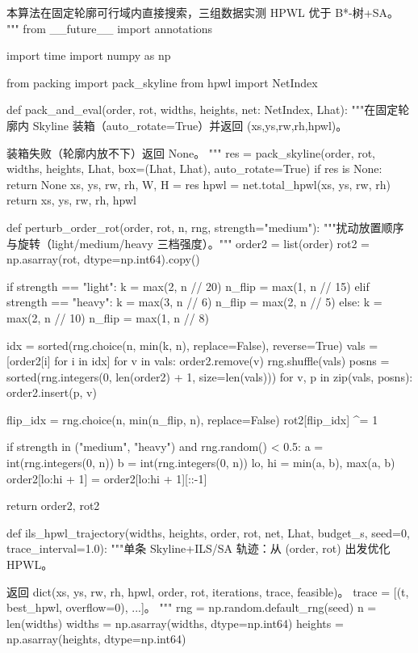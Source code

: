 \documentclass{JXUSTmodeling}
\begin{document}
\begin{appendixx}
\begin{python}
本算法在固定轮廓可行域内直接搜索，三组数据实测 HPWL 优于 B*-树+SA。
"""
from __future__ import annotations

import time
import numpy as np

from packing import pack_skyline
from hpwl import NetIndex


def pack_and_eval(order, rot, widths, heights, net: NetIndex, Lhat):
    """在固定轮廓内 Skyline 装箱（auto_rotate=True）并返回 (xs,ys,rw,rh,hpwl)。

    装箱失败（轮廓内放不下）返回 None。
    """
    res = pack_skyline(order, rot, widths, heights, Lhat,
                       box=(Lhat, Lhat), auto_rotate=True)
    if res is None:
        return None
    xs, ys, rw, rh, W, H = res
    hpwl = net.total_hpwl(xs, ys, rw, rh)
    return xs, ys, rw, rh, hpwl


def perturb_order_rot(order, rot, n, rng, strength="medium"):
    """扰动放置顺序与旋转（light/medium/heavy 三档强度）。"""
    order2 = list(order)
    rot2 = np.asarray(rot, dtype=np.int64).copy()

    if strength == "light":
        k = max(2, n // 20)
        n_flip = max(1, n // 15)
    elif strength == "heavy":
        k = max(3, n // 6)
        n_flip = max(2, n // 5)
    else:
        k = max(2, n // 10)
        n_flip = max(1, n // 8)

    idx = sorted(rng.choice(n, min(k, n), replace=False), reverse=True)
    vals = [order2[i] for i in idx]
    for v in vals:
        order2.remove(v)
    rng.shuffle(vals)
    posns = sorted(rng.integers(0, len(order2) + 1, size=len(vals)))
    for v, p in zip(vals, posns):
        order2.insert(p, v)

    flip_idx = rng.choice(n, min(n_flip, n), replace=False)
    rot2[flip_idx] ^= 1

    if strength in ("medium", "heavy") and rng.random() < 0.5:
        a = int(rng.integers(0, n))
        b = int(rng.integers(0, n))
        lo, hi = min(a, b), max(a, b)
        order2[lo:hi + 1] = order2[lo:hi + 1][::-1]

    return order2, rot2


def ils_hpwl_trajectory(widths, heights, order, rot, net, Lhat, budget_s,
                        seed=0, trace_interval=1.0):
    """单条 Skyline+ILS/SA 轨迹：从 (order, rot) 出发优化 HPWL。

    返回 dict(xs, ys, rw, rh, hpwl, order, rot, iterations, trace, feasible)。
    trace = [(t, best_hpwl, overflow=0), ...]。
    """
    rng = np.random.default_rng(seed)
    n = len(widths)
    widths = np.asarray(widths, dtype=np.int64)
    heights = np.asarray(heights, dtype=np.int64)


\end{python}
\end{appendixx}
\end{document}
